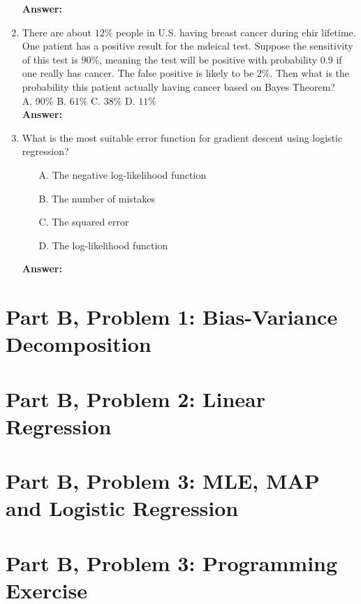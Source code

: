 \documentclass{article}
\begin{document}
\begin{enumerate}
\begin{itemize}
	\end{itemize}
	\textbf{Answer:}
	\hspace{3em}
	\item There are about $12\%$ people in U.S. having breast cancer during ehir lifetime. One patient has a positive result for the mdeical test. Suppose the sensitivity of this test is $90\%$, meaning the test will be positive with probability $0.9$ if one really has cancer. The false positive is likely to be $2\%$. Then what is the probability this patient actually having cancer based on Bayes Theorem?\\
	A. $90\%$ \hspace{0.1\textwidth} B. $61\%$ \hspace{0.1\textwidth} C. $38\%$ \hspace{0.1\textwidth} D. $11\%$\\
	\textbf{Answer:}
	\hspace{3em}
	\item What is the most suitable error function for gradient descent using logistic regression?
	\begin{itemize}
		\item [A.] The negative log-likelihood function
		\item [B.] The number of mistakes
		\item [C.] The squared error
		\item [D.] The log-likelihood function
	\end{itemize}
	\textbf{Answer:}
	\hspace{3em}
\end{enumerate}


\newpage

\section*{Part B, Problem 1: Bias-Variance Decomposition}
\newpage

\section*{Part B, Problem 2: Linear Regression}
\newpage

\section*{Part B, Problem 3: MLE, MAP and Logistic Regression}
\newpage

\section*{Part B, Problem 3: Programming Exercise}
\newpage
\end{document}
